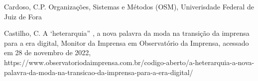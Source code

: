 \documentclass[
12pt,		%
openright,	%
twoside,  %
a4paper,			%
chapter=TITLE,		%
english,			%
french,				%
spanish,			%
brazil				%
]{USPSC-classe/USPSC}
\begin{document}
\begin{flushleft}
\begin{flushleft}
\begin{flushleft}
\begin{flushleft}
\begin{flushleft}
\begin{flushleft}
\begin{flushleft}
\begin{flushleft}
\begin{flushleft}
[CARDOSO, 2014] Cardoso, C.P. Organiza\c{c}\~oes, Sistemas e M\'etodos (OSM), Univerisdade Federal de Juiz de Fora
\end{flushleft}


\end{flushleft}


\end{flushleft}


\end{flushleft}


\end{flushleft}


\end{flushleft}


\end{flushleft}


\end{flushleft}


\end{flushleft}


\begin{flushleft}
\begin{flushleft}
\begin{flushleft}
\begin{flushleft}
\begin{flushleft}
\begin{flushleft}
\begin{flushleft}
\begin{flushleft}
\begin{flushleft}
[CASTILHO, 2008] Castilho, C. A ‘heterarquia” , a nova palavra da moda na transi\c{c}\~ao da imprensa para a era digital, Monitor da Imprensa em Observat\'orio da Imprensa, acessado em 28 de novembro de 2022, https://www.observatoriodaimprensa.com.br/codigo-aberto/a-heterarquia-a-nova-palavra-da-moda-na-transicao-da-imprensa-para-a-era-digital/
\end{flushleft}


\end{flushleft}


\end{flushleft}


\end{flushleft}


\end{flushleft}


\end{flushleft}


\end{flushleft}


\end{flushleft}


\end{flushleft}
\end{document}
